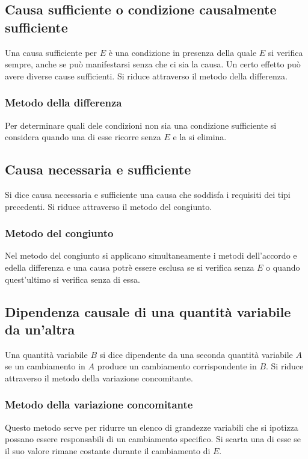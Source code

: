 \subsection{Causa sufficiente o condizione causalmente sufficiente}
Una causa sufficiente per $E$ \`e una condizione in presenza della quale $E$ si verifica sempre, anche se pu\`o manifestarsi senza che ci sia la causa. Un 
certo effetto pu\`o avere diverse cause sufficienti. Si riduce attraverso il metodo della differenza.
\subsubsection{Metodo della differenza}
Per determinare quali dele condizioni non sia una condizione sufficiente si considera quando una di esse ricorre senza $E$ e la si elimina. 
\subsection{Causa necessaria e sufficiente}
Si dice causa necessaria e sufficiente una causa che soddisfa i requisiti dei tipi precedenti. Si riduce attraverso il metodo del congiunto.
\subsubsection{Metodo del congiunto}
Nel metodo del congiunto si applicano simultaneamente i metodi dell'accordo e edella differenza e una causa potr\`e essere esclusa se si verifica senza $E$
o quando quest'ultimo si verifica senza di essa. 
\subsection{Dipendenza causale di una quantit\`a variabile da un'altra}
Una quantit\`a variabile $B$ si dice dipendente da una seconda quantit\`a variabile $A$ se un cambiamento in $A$ produce un cambiamento corrispondente in 
$B$. Si riduce attraverso il metodo della variazione concomitante.
\subsubsection{Metodo della variazione concomitante}
Questo metodo serve per ridurre un elenco di grandezze variabili che si ipotizza possano essere responsabili di un cambiamento specifico. Si scarta una
di esse se il suo valore rimane costante durante il cambiamento di $E$. 
